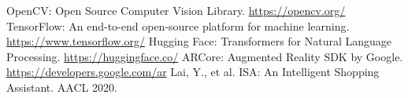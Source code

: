 \begin{thebibliography}{9}
     OpenCV: Open Source Computer Vision Library. \url{https://opencv.org/}
     TensorFlow: An end-to-end open-source platform for machine learning. \url{https://www.tensorflow.org/}
     Hugging Face: Transformers for Natural Language Processing. \url{https://huggingface.co/}
     ARCore: Augmented Reality SDK by Google. \url{https://developers.google.com/ar}
     Lai, Y., et al. ISA: An Intelligent Shopping Assistant. AACL 2020.
\end{thebibliography}


